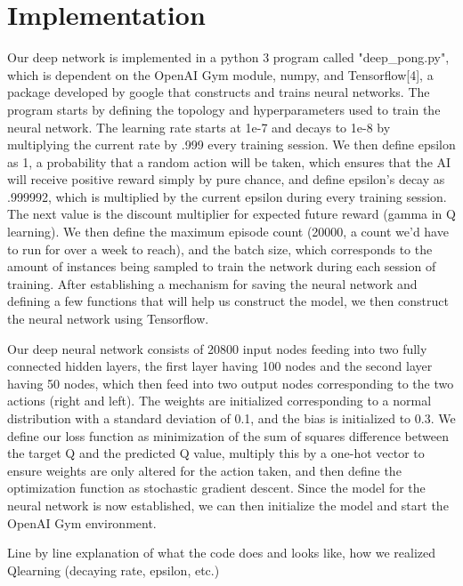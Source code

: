 \documentclass[12pt]{article}
\theoremstyle{plain}
\theoremstyle{definition}
\theoremstyle{remark}
\theoremstyle{plain}
\begin{document}
\section{Implementation}
\par
Our deep network is implemented in a python 3 program called "deep\_pong.py", which is dependent on the OpenAI Gym module, numpy, and Tensorflow[4], a package developed by google that constructs and trains neural networks.  The program starts by defining the topology and hyperparameters used to train the neural network.  The learning rate starts at 1e-7 and decays to 1e-8 by multiplying the current rate by .999 every training session.  We then define epsilon as 1, a probability that a random action will be taken, which ensures that the AI will receive positive reward simply by pure chance, and define epsilon's decay as .999992, which is multiplied by the current epsilon during every training session.  The next value is the discount multiplier for expected future reward (gamma in Q learning).  We then define the maximum episode count (20000, a count we'd have to run for over a week to reach), and the batch size, which corresponds to the amount of instances being sampled to train the network during each session of training.  After establishing a mechanism for saving the neural network and defining a few functions that will help us construct the model, we then construct the neural network using Tensorflow.
\par
Our deep neural network consists of 20800 input nodes feeding into two fully connected hidden layers, the first layer having 100 nodes and the second layer having 50 nodes, which then feed into two output nodes corresponding to the two actions (right and left).  The weights are initialized corresponding to a normal distribution with a standard deviation of 0.1, and the bias is initialized to 0.3.  We define our loss function as minimization of the sum of squares difference between the target Q and the predicted Q value, multiply this by a one-hot vector to ensure weights are only altered for the action taken, and then define the optimization function as stochastic gradient descent.  Since the model for the neural network is now established, we can then initialize the model and start the OpenAI Gym environment.
\par

Line by line explanation of what the code does and looks like, how we realized Qlearning (decaying rate, epsilon, etc.)
\end{document}
